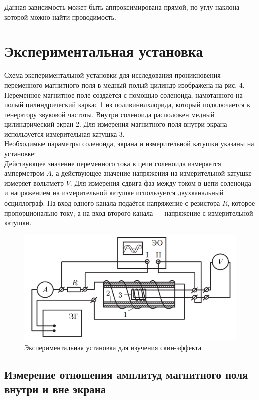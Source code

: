 \documentclass[a4paper,12pt]{article}
\theoremstyle{plain} %
\theoremstyle{definition} %
\theoremstyle{remark} %
\begin{document}
	Данная зависимость может быть аппроксимирована прямой, по углу наклона которой можно найти проводимость.
	\section{Экспериментальная установка}
	\indent Схема экспериментальной установки для исследования проникновения переменного магнитного поля в медный полый цилиндр изображена на рис. 4. Переменное магнитное поле создаётся с помощью соленоида, намотанного на полый цилиндрический каркас 1 из поливинилхлорида, который подключается к генератору звуковой частоты. Внутри соленоида расположен медный цилиндрический экран 2. Для измерения магнитного поля внутри экрана используется измерительная катушка 3.\\
	\indent Необходимые параметры соленоида, экрана и измерительной катушки
	указаны на установке: \\
	\indent Действующее значение переменного тока в цепи соленоида измеряется амперметром $A$, а действующее значение напряжения на измерительной катушке измеряет вольтметр $V$. Для измерения сдвига фаз между током в цепи соленоида и напряжением на измерительной катушке используется двухканальный осциллограф. На вход одного канала подаётся напряжение с резистора $R$, которое пропорционально току, а на вход второго канала — напряжение с измерительной катушки.\\
	\begin{figure}[h]
		\centering
		\includegraphics[width=0.75\linewidth]{ust.png}
		\caption{Экспериментальная установка для изучения скин-эффекта}
	\label{fig:mpr}
	\end{figure}
	
	\subsection{Измерение отношения амплитуд магнитного поля внутри и вне экрана}
	
\end{document}
